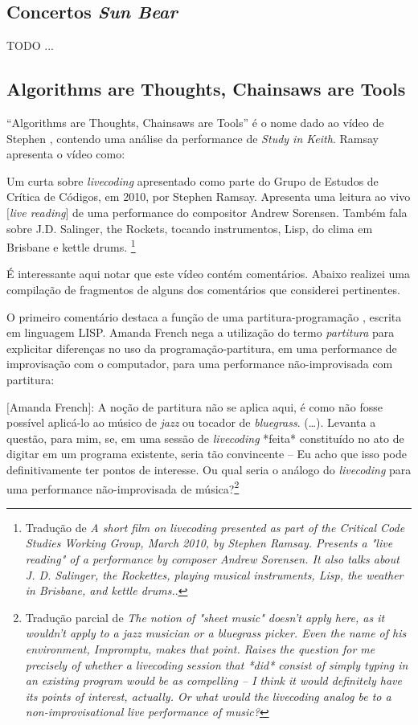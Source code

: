 \documentclass[
	12pt,				%
	openright,			%
	twoside,			%
	a4paper,			%
	english,			%
	french,				%
	spanish,			%
        italian,                        %
	brazil				%
	]{abntex2}
\begin{document}
\subsection{Concertos \emph{Sun Bear}}

TODO ...

\subsection{Algorithms are Thoughts, Chainsaws are Tools}

``Algorithms are Thoughts, Chainsaws are Tools'' é o nome dado ao vídeo de Stephen , contendo uma análise da performance de \emph{Study in Keith}. Ramsay apresenta o vídeo como:

\begin{citacao}
Um curta sobre \emph{livecoding} apresentado como parte do Grupo de Estudos de Crítica de Códigos, em 2010, por Stephen Ramsay. Apresenta uma leitura ao vivo $[$\emph{live reading}$]$ de uma performance do compositor Andrew Sorensen. Também fala sobre J.D. Salinger, the Rockets, tocando instrumentos, Lisp, do clima em Brisbane e kettle drums. \footnote{Tradução de \emph{A short film on livecoding presented as part of the Critical Code Studies Working Group, March 2010, by Stephen Ramsay. Presents a "live reading" of a performance by composer Andrew Sorensen. It also talks about J. D. Salinger, the Rockettes, playing musical instruments, Lisp, the weather in Brisbane, and kettle drums.}.}
\end{citacao}
É interessante aqui notar que este vídeo contém comentários. Abaixo realizei uma compilação de fragmentos de alguns dos comentários que considerei pertinentes. 

O primeiro comentário destaca a função de uma partitura-programação \cite[p.~5]{fenerich_marulho_2014}, escrita em linguagem LISP. Amanda French nega a utilização do termo \emph{partitura} para explicitar diferenças no uso da programação-partitura, em uma performance de improvisação com o computador, para uma performance não-improvisada com partitura:

\begin{citacao}
$[$Amanda French$]$: A noção de partitura não se aplica aqui, é como não fosse possível aplicá-lo ao músico de \emph{jazz} ou tocador de \emph{bluegrass}. (\ldots). Levanta a questão, para mim, se, em uma sessão de \emph{livecoding} *feita* constituído no ato de digitar em um programa existente, seria tão convincente -- Eu acho que isso pode definitivamente ter pontos de interesse. Ou qual seria o análogo do \emph{livecoding} para uma performance não-improvisada de música?\footnote{Tradução parcial de \emph{The notion of "sheet music" doesn't apply here, as it wouldn't apply to a jazz musician or a bluegrass picker. Even the name of his environment, Impromptu, makes that point. Raises the question for me precisely of whether a livecoding session that *did* consist of simply typing in an existing program would be as compelling -- I think it would definitely have its points of interest, actually. Or what would the livecoding analog be to a non-improvisational live performance of music?}}
\end{citacao}
\end{document}
